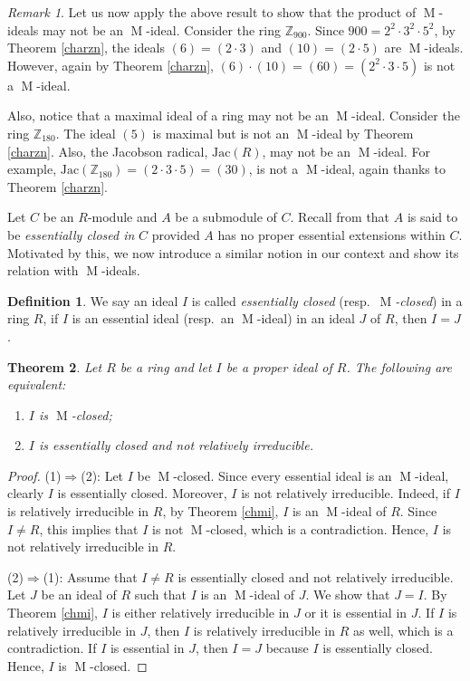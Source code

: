 \documentclass[11pt,leqno]{amsart}
\DeclareMathOperator{\m}{M}
\newtheorem{theorem}{Theorem}[section]
\theoremstyle{definition}
\newtheorem{definition}{Definition}[section]
\theoremstyle{remark}
\newtheorem{remark}[theorem]{Remark}
\numberwithin{equation}{section}
\numberwithin{equation}{section}
\begin{document}
\begin{remark}
Let us now apply the above result to show that the product of $\m$-ideals may not be an $\m$-ideal.	Consider the ring $\mathds{Z}_{900}$. Since $900=2^2\cdot 3^2 \cdot 5^2$, by Theorem \ref{charzn}, the ideals $(6)=(2\cdot 3)$ and $(10)=(2\cdot 5)$ are $\m$-ideals. However, again by Theorem \ref{charzn}, $(6)\cdot(10)=(60)=(2^2\cdot 3 \cdot 5)$ is not a $\m$-ideal. 

Also, notice that a maximal ideal of a ring may not be an $\m$-ideal.	Consider the ring $\mathds{Z}_{180}$. The ideal $(5)$ is maximal but is not an $\m$-ideal by Theorem \ref{charzn}. Also, the Jacobson radical, $\mathrm{Jac}(R)$, may not be an $\m$-ideal. For example, $\mathrm{Jac}(\mathds{Z}_{180})=(2\cdot 3 \cdot 5)=(30)$, is not a $\m$-ideal, again thanks to Theorem \ref{charzn}.  
\end{remark}

Let $C$ be an $R$-module and $A$ be a submodule of $C$. Recall from \cite{GW04} that $A$ is said to be
\emph{essentially closed in} $C$ provided $A$ has no proper essential extensions within
$C$. Motivated by this, we now introduce a similar notion in our context and show its relation with $\m$-ideals.

\begin{definition}
We say an ideal $I$ is called \emph{essentially closed} (resp.\ \emph{$\m$-closed}) in a ring $R$, if $I$ is an essential ideal  (resp.\ an $\m$-ideal) in an ideal $J$ of $R$, then $I=J$.     
\end{definition}

\begin{theorem}\label{charmuclosed}
Let $R$ be a ring and let $I$ be a proper ideal of  $R$. The following are equivalent:
\begin{enumerate}
\item $I$ is $\m$-closed;

\item $I$ is essentially closed and not relatively irreducible.
\end{enumerate}
\end{theorem}

\begin{proof}
(1)$\Rightarrow$(2): Let $I$ be $\m$-closed. Since every essential ideal is an $\m$-ideal, clearly $I$ is essentially closed. Moreover, $I$ is not relatively irreducible. Indeed, if $I$ is  relatively  irreducible in $R$, by Theorem \ref{chmi}, $I$ is an $\m$-ideal of $R$. Since $I\neq R$, this implies that $I$ is not $\m$-closed, which is a contradiction. Hence, $I$ is not relatively irreducible in $R$.
		
(2)$\Rightarrow$(1): Assume that $I\neq R$ is essentially closed and not relatively irreducible. Let $J$ be an ideal of $R$ such that $I$ is an $\m$-ideal of $J$. We show that $J=I$. By Theorem \ref{chmi},  $I$ is either relatively irreducible in $J$ or it is essential in $J$. If $I$ is relatively irreducible in $J$, then $I$ is relatively irreducible in $R$ as well, which is a contradiction. If $I$ is essential in $J$, then $I=J$ because $I$ is essentially closed. Hence, $I$ is $\m$-closed. 
\end{proof}
\end{document}
